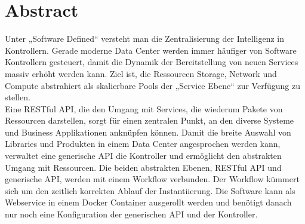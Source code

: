 \chapter*{Abstract}

Unter „Software Defined“ versteht man die Zentralisierung der Intelligenz in Kontrollern. Gerade moderne Data Center werden immer häufiger von Software Kontrollern gesteuert, damit die Dynamik der Bereitstellung von neuen Services massiv erhöht werden kann. Ziel ist, die Ressourcen Storage, Network und Compute abstrahiert als skalierbare Pools der „Service Ebene“ zur Verfügung zu stellen.\\
Eine RESTful API, die den Umgang mit Services, die wiederum Pakete von Ressourcen darstellen, sorgt für einen zentralen Punkt, an den diverse Systeme und Business Applikationen anknüpfen können. Damit die breite Auswahl von Libraries und Produkten in einem Data Center angesprochen werden kann, verwaltet eine generische API die Kontroller und ermöglicht den abstrakten Umgang mit Ressourcen. Die beiden abstrakten Ebenen, RESTful API und generische API, werden mit einem Workflow verbunden. Der Workflow kümmert sich um den zeitlich korrekten Ablauf der Instantiierung. Die Software kann als Webservice in einem Docker Container ausgerollt werden und benötigt danach nur noch eine Konfiguration der generischen API und der Kontroller.